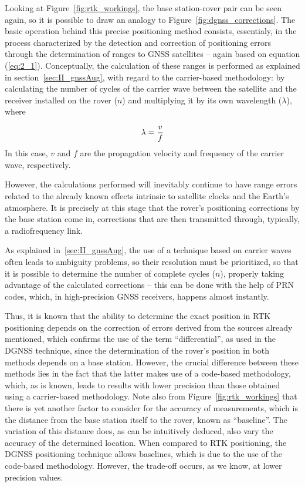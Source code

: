Looking at Figure~\ref{fig:rtk_workings}, the base station-rover pair can be seen again, so it is possible to draw an analogy to Figure~\ref{fig:dgnss_corrections}. The basic operation behind this precise positioning method consists, essentialy, in the process characterized by the detection and correction of positioning errors through the determination of ranges to GNSS satellites -- again based on equation (\ref{eq:2_1}). Conceptually, the calculation of these ranges is performed as explained in section~\ref{sec:II_gnssAug}, with regard to the carrier-based methodology: by calculating the number of cycles of the carrier wave between the satellite and the receiver installed on the rover ($n$) and multiplying it by its own wavelength ($\lambda$), where

\begin{equation}\label{eq:2_4}
    \lambda = \frac{v}{f}\medskip
\end{equation}
In this case, $v$ and $f$ are the propagation velocity and frequency of the carrier wave, respectively.

However, the calculations performed will inevitably continue to have range errors related to the already known effects intrinsic to satellite clocks and the Earth's atmosphere. It is precisely at this stage that the rover's positioning corrections by the base station come in, corrections that are then transmitted through, typically, a radiofrequency link.

As explained in~\ref{sec:II_gnssAug}, the use of a technique based on carrier waves often leads to ambiguity problems, so their resolution must be prioritized, so that it is possible to determine the number of complete cycles ($n$), properly taking advantage of the calculated corrections -- this can be done with the help of PRN codes, which, in high-precision GNSS receivers, happens almost instantly.

Thus, it is known that the ability to determine the exact position in RTK positioning depends on the correction of errors derived from the sources already mentioned, which confirms the use of the term ``differential'', as used in the DGNSS technique, since the determination of the rover's position in both methods depends on a base station. However, the crucial difference between these methods lies in the fact that the latter makes use of a code-based methodology, which, as is known, leads to results with lower precision than those obtained using a carrier-based methodology. Note also from Figure~\ref{fig:rtk_workings} that there is yet another factor to consider for the accuracy of measurements, which is the distance from the base station itself to the rover, known as ``baseline''. The variation of this distance does, as can be intuitively deduced, also vary the accuracy of the determined location. When compared to RTK positioning, the DGNSS positioning technique allows baselines, which is due to the use of the code-based methodology. However, the trade-off occurs, as we know, at lower precision values.

